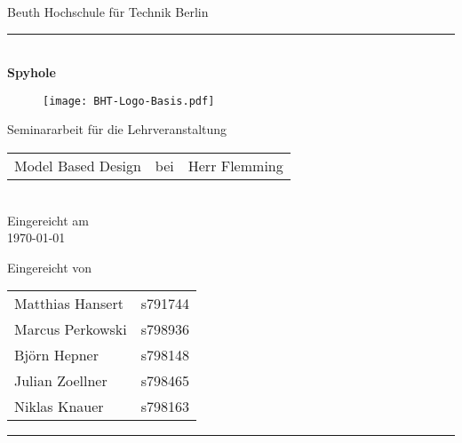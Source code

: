 

\begin{titlepage}
	\begin{center}
		\Large
		Beuth Hochschule für Technik Berlin
		\textcolor{darkBHT}{\rule{\textwidth}{0.2cm}} \\
		\vspace{2 cm}
		\Huge
		\textbf{Spyhole}
		\vspace{2 cm}
		
		\begin{figure}[htbp]
			\centering 
			\texttt{[image: BHT-Logo-Basis.pdf]}  
		\end{figure}
		
		\vspace{3cm}
		\Large
		Seminararbeit für die Lehrveranstaltung \\
		\begin{tabular}{lcl}
			Model Based Design & bei & Herr Flemming\\
		\end{tabular} 
		\\
		\vspace{0.8cm}
		Eingereicht am \\
		\today %
		\vspace{0.8cm}
		
		Eingereicht von \\
		\begin{tabular}{ll}
			Matthias Hansert & s791744\\
			Marcus Perkowski & s798936\\
			Björn Hepner & s798148\\
			Julian Zoellner & s798465\\
			Niklas Knauer & s798163\\
		\end{tabular}

	\end{center}
	\vfill
	\textcolor{darkBHT}{\rule{\textwidth}{0.2cm}}
	\vspace{1 cm}
	\normalsize
	
\end{titlepage}

%
%